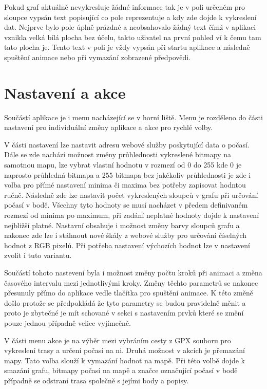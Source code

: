 \documentclass[czech,bachelor,dept460,male,csharp,cpdeclaration]{diploma}
\begin{document}
	Pokud graf aktuálně nevykresluje žádné informace tak je v poli určeném pro sloupce vypsán text popisující co pole reprezentuje a kdy zde dojde k vykreslení dat. Nejprve bylo pole úplně prázdné a neobsahovalo žádný text čímž v aplikaci vznikla velká bílá plocha bez účelu, takto uživatel na první pohled ví k čemu tam tato plocha je. Tento text v poli je vždy vypsán při startu aplikace a následně spuštění animace nebo při vymazání zobrazené předpovědi.
	
	\section{Nastavení a akce}
	
	Součástí aplikace je i menu nacházející se v horní liště. Menu je rozděleno do části nastavení pro individuální změny aplikace a akce pro rychlé volby.
	
	V části nastavení lze nastavit adresu webové služby poskytující data o počasí. Dále se zde nachází možnost změny průhlednosti vykreslené bitmapy na samotnou mapu, lze vybrat vlastní hodnotu v rozmezí od 0 do 255 kde 0 je naprosto průhledná bitmapa a 255 bitmapa bez jakékoliv průhlednosti je zde i volba pro přímé nastavení minima či maxima bez potřeby zapisovat hodntou ručně. Následně zde lze nastavit počet vykreslených sloupců v grafu při určování počasí v bodě. Všechny tyto hodnoty se musí nacházet v předem definivaném rozmezí od minima po maximum, při zadání neplatné hodnoty dojde k nastavení nejbližší platné. Nastavní obsahuje i možnost změny barvy sloupců grafu a nakonec zde lze i stáhnout nové škály z webové služby pro určování číselných hodnot z RGB pixelů. Při potřeba nastavení výchozích hodnot lze v nastavení zvolit i tuto variantu.
	
	Součástí tohoto nastevení byla i možnost změny počtu kroků při animaci a změna časového intervalu mezi jednotlivými kroky. Změny těchto parametrů se nakonec přesunuly přímo do aplikace vedle tlačítka pro spuštění animace. K této změně došlo protože se předpokládá že tyto parametry se budou pravidelně měnit a proto je zbytečné je mít schované v sekci s nastavením prvků které se změní pouze jednou případně velice vyjímečně.
	
	V části menu akce je na výběr mezi vybráním cesty z GPX souboru pro vykreslení trasy a určení počasí na ni. Druhá možnost v akcích je přemazání mapy. Tato volba slouží k vymazání hodnot na mapě. Při této volbě dojde k smazání grafu, bitmapy počasí na mapě a značce označující počasí v bodě případně se odstraní trasa společně s jejími body a popisy.
	
\end{document}
